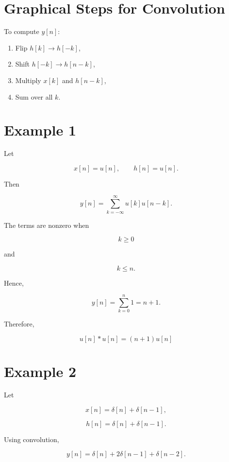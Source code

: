 \section{Graphical Steps for Convolution}

To compute \(y[n]\):

\begin{enumerate}
\item Flip \(h[k]\rightarrow h[-k]\),
\item Shift \(h[-k]\rightarrow h[n-k]\),
\item Multiply \(x[k]\) and \(h[n-k]\),
\item Sum over all \(k\).
\end{enumerate}


\section{Example 1}

Let

\[
x[n]=u[n],
\qquad
h[n]=u[n].
\]

Then

\[
y[n]=
\sum_{k=-\infty}^{\infty}
u[k]u[n-k].
\]

The terms are nonzero when

\[
k\ge0
\]

and

\[
k\le n.
\]

Hence,

\[
y[n]=
\sum_{k=0}^{n}1
=
n+1.
\]

Therefore,

\[
\boxed{
u[n]*u[n]=(n+1)u[n]
}
\]


\section{Example 2}

Let

\[
x[n]=\delta[n]+\delta[n-1],
\]

\[
h[n]=\delta[n]+\delta[n-1].
\]

Using convolution,

\[
y[n]=
\delta[n]
+2\delta[n-1]
+\delta[n-2].
\]


